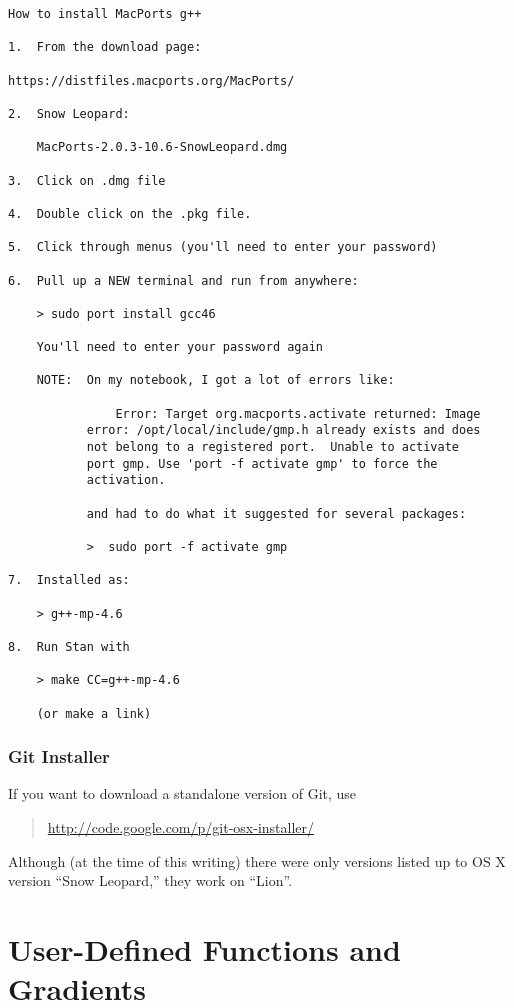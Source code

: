 \begin{Verbatim}
How to install MacPorts g++

1.  From the download page:

https://distfiles.macports.org/MacPorts/

2.  Snow Leopard:

    MacPorts-2.0.3-10.6-SnowLeopard.dmg

3.  Click on .dmg file

4.  Double click on the .pkg file.

5.  Click through menus (you'll need to enter your password)

6.  Pull up a NEW terminal and run from anywhere:

    > sudo port install gcc46

    You'll need to enter your password again

    NOTE:  On my notebook, I got a lot of errors like:

               Error: Target org.macports.activate returned: Image
	       error: /opt/local/include/gmp.h already exists and does
	       not belong to a registered port.  Unable to activate
	       port gmp. Use 'port -f activate gmp' to force the
	       activation.

           and had to do what it suggested for several packages:

           >  sudo port -f activate gmp

7.  Installed as:

    > g++-mp-4.6

8.  Run Stan with

    > make CC=g++-mp-4.6

    (or make a link)
\end{Verbatim}


\subsection{Git Installer}

If you want to download a standalone version of Git, use

\begin{quote}
\url{http://code.google.com/p/git-osx-installer/}
\end{quote}

Although (at the time of this writing) there were only versions listed
up to OS X version ``Snow Leopard,'' they work on ``Lion''.

\chapter{User-Defined Functions and Gradients}\label{user-defined-functions.appendix}


